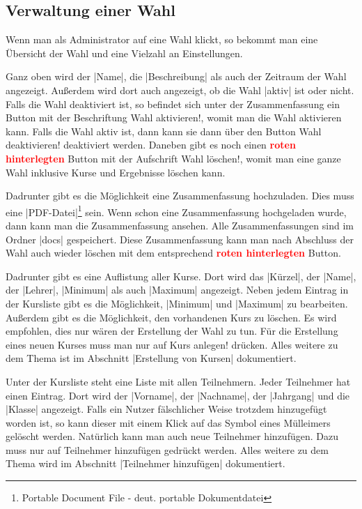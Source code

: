 \documentclass[ngerman]{ltxdoc}
\begin{document}
\subsection{Verwaltung einer Wahl}

Wenn man als Administrator auf eine Wahl klickt, so bekommt man eine Übersicht
der Wahl und eine Vielzahl an Einstellungen.

Ganz oben wird der |Name|, die |Beschreibung| als auch der Zeitraum der Wahl angezeigt.
Außerdem wird dort auch angezeigt, ob die Wahl |aktiv| ist oder nicht. Falls die
Wahl deaktiviert ist, so befindet sich unter der Zusammenfassung ein Button mit der
Beschriftung \glqq Wahl aktivieren!\grqq{}, womit man die Wahl aktivieren kann. Falls
die Wahl aktiv ist, dann kann sie dann über den Button \glqq Wahl deaktivieren!\grqq
deaktiviert werden. Daneben gibt es noch einen \textcolor{red}{\textbf{roten hinterlegten}}
Button mit der Aufschrift \glqq Wahl löschen!\grqq{}, womit man eine ganze Wahl inklusive
Kurse und Ergebnisse löschen kann.

Dadrunter gibt es die Möglichkeit eine Zusammenfassung hochzuladen. Dies muss eine
|PDF-Datei|\footnote{Portable Document File - deut. portable Dokumentdatei} sein.
Wenn schon eine Zusammenfassung hochgeladen wurde, dann kann man die Zusammenfassung
ansehen. Alle Zusammenfassungen sind im Ordner |docs| gespeichert. Diese Zusammenfassung
kann man nach Abschluss der Wahl auch wieder löschen mit dem entsprechend \textcolor{red}{\textbf{roten hinterlegten}}
Button.

Dadrunter gibt es eine Auflistung aller Kurse. Dort wird das |Kürzel|, der |Name|,
der |Lehrer|, |Minimum| als auch |Maximum| angezeigt. Neben jedem Eintrag in der
Kursliste gibt es die Möglichkeit, |Minimum| und |Maximum| zu bearbeiten. Außerdem
gibt es die Möglichkeit, den vorhandenen Kurs zu löschen. Es wird empfohlen, dies
nur wären der Erstellung der Wahl zu tun. Für die Erstellung eines neuen Kurses
muss man nur auf \glqq Kurs anlegen!\grqq{} drücken. Alles weitere zu dem Thema ist
im Abschnitt |Erstellung von Kursen| dokumentiert.

Unter der Kursliste steht eine Liste mit allen Teilnehmern. Jeder Teilnehmer
hat einen Eintrag. Dort wird der |Vorname|, der |Nachname|, der |Jahrgang|
und die |Klasse| angezeigt. Falls ein Nutzer fälschlicher Weise trotzdem hinzugefügt
worden ist, so kann dieser mit einem Klick auf das Symbol eines Mülleimers gelöscht
werden. Natürlich kann man auch neue Teilnehmer hinzufügen. Dazu muss nur auf
\glqq Teilnehmer hinzufügen\grqq{} gedrückt werden. Alles weitere zu dem Thema wird
im Abschnitt |Teilnehmer hinzufügen| dokumentiert.
\end{document}
